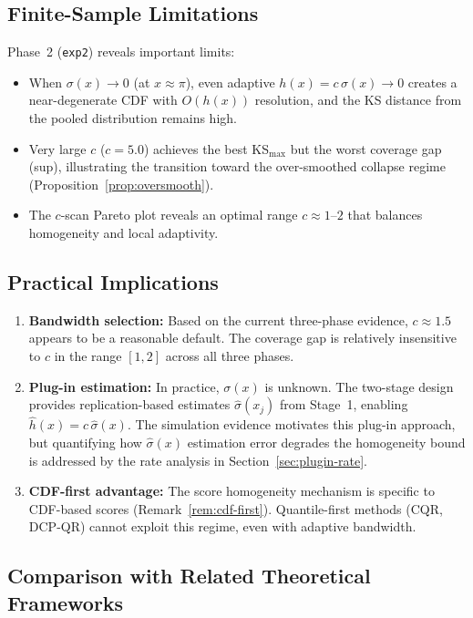 \documentclass[11pt]{article}
\theoremstyle{remark}
\begin{document}
\subsection{Finite-Sample Limitations}

Phase~2 (\texttt{exp2}) reveals important limits:
\begin{itemize}
  \item When $\sigma(x) \to 0$ (at $x \approx \pi$), even adaptive
    $h(x) = c\,\sigma(x) \to 0$ creates a near-degenerate CDF with
    $O(h(x))$ resolution, and the KS distance from the pooled
    distribution remains high.
  \item Very large $c$ ($c = 5.0$) achieves the best KS$_{\max}$
    but the worst coverage gap (sup), illustrating the transition
    toward the over-smoothed collapse regime
    (Proposition~\ref{prop:oversmooth}).
  \item The $c$-scan Pareto plot reveals an optimal range
    $c \approx 1$--$2$ that balances homogeneity and local adaptivity.
\end{itemize}

\subsection{Practical Implications}

\begin{enumerate}
  \item \textbf{Bandwidth selection:} Based on the current three-phase
    evidence, $c \approx 1.5$ appears to be a reasonable default.
    The coverage gap is relatively insensitive to $c$ in the range
    $[1, 2]$ across all three phases.
  \item \textbf{Plug-in estimation:} In practice, $\sigma(x)$ is
    unknown. The two-stage design provides replication-based estimates
    $\hat\sigma(x_j)$ from Stage~1, enabling
    $\hat{h}(x) = c\,\hat\sigma(x)$. The simulation evidence
    motivates this plug-in approach, but quantifying how
    $\hat\sigma(x)$ estimation error degrades the homogeneity bound
    is addressed by the rate analysis in
    Section~\ref{sec:plugin-rate}.
  \item \textbf{CDF-first advantage:} The score homogeneity mechanism
    is specific to CDF-based scores (Remark~\ref{rem:cdf-first}).
    Quantile-first methods (CQR, DCP-QR) cannot exploit this regime,
    even with adaptive bandwidth.
\end{enumerate}

\subsection{Comparison with Related Theoretical Frameworks}
\label{sec:related-comparison}
\end{document}

